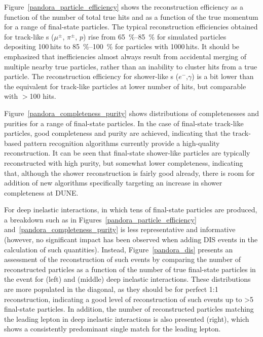 Figure~\ref{pandora_particle_efficiency} shows the reconstruction efficiency as a function of the number of total true \twod hits and as a function of the true momentum for a range of final-state particles. The typical reconstruction efficiencies obtained for track-like s ($\mu^{\pm}$, $\pi^{\pm}$, $p$) rise from \SIrange{65}{85}{\%} for simulated particles depositing 100\,hits to \SIrange{85}{100}{\%} for particles with 1000\,hits. It should be emphasized that inefficiencies almost always result from accidental merging of multiple nearby true particles, rather than an inability to cluster hits from a true particle. The reconstruction efficiency for shower-like s ($e^{-}$,$\gamma$) is a bit lower than the equivalent for track-like particles at lower number of hits, but comparable with $>$100 hits.

Figure~\ref{pandora_completeness_purity} shows distributions of completenesses and purities for a range of final-state particles. In the case of final-state track-like particles, good completeness and purity are %
achieved, indicating that the track-based pattern recognition algorithms currently provide a high-quality reconstruction. It can be seen that final-state shower-like particles are typically reconstructed with high purity, but somewhat lower completeness, indicating that, although the shower reconstruction is fairly good already, there is room for addition of new algorithms specifically targeting an increase in shower completeness at DUNE.

For deep inelastic interactions, in which tens of final-state particles are produced, a breakdown such as in Figures~\ref{pandora_particle_efficiency} and~\ref{pandora_completeness_purity} is less representative and informative (however, no significant impact has been observed when adding DIS events in the calculation of such quantities). Instead, Figure~\ref{pandora_dis} presents an assessment of the reconstruction of such events %
by comparing the number of reconstructed particles as a function of the number of true final-state particles in the event for  (left) and  (middle) deep inelastic interactions. These distributions are more populated in the diagonal, as they should be for perfect 1:1 reconstruction, indicating a good level of reconstruction of such events up to >5 final-state particles. In addition, the number of reconstructed particles matching the leading lepton in  deep inelastic interactions is also presented (right), which shows a consistently predominant single match for the leading lepton. 

